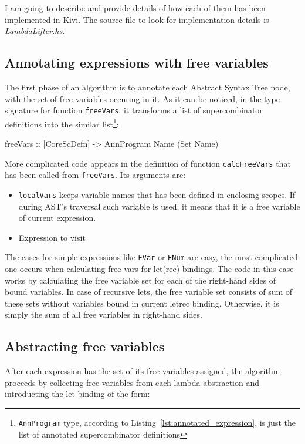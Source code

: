 \documentclass[12pt,a4paper]{report}
\begin{document}
I am going to describe and provide details of how each of them has been
implemented in Kivi. The source file to look for implementation details is
\textit{LambdaLifter.hs}.

\subsection{Annotating expressions with free variables}
The first phase of an algorithm is to annotate each Abstract Syntax Tree
node, with the set of free variables occuring in it. As it can be noticed,
in the type signature for function \texttt{freeVars}, it transforms a list of
supercombinator definitions into the similar list\footnote{\texttt{AnnProgram}
type, according to Listing~\ref{lst:annotated_expression}, is just the list of
annotated supercombinator definitions}:

\vspace*{0.2in}
\begin{code}[style=haskell]
  freeVars :: [CoreScDefn] -> AnnProgram Name (Set Name)
\end{code}

More complicated code appears in the definition of function
\texttt{calcFreeVars} that has been called from \texttt{freeVars}. Its
arguments are:
\begin{itemize}
  \item \texttt{localVars} keeps variable names that has been defined in
    enclosing scopes. If during AST's traversal such variable is used, it
    means that it is a free variable of current expression.
  \item Expression to visit
\end{itemize}

The cases for simple expressions like \texttt{EVar} or \texttt{ENum} are easy,
the most complicated one occurs when calculating free vars for let(rec)
bindings. The code in this case works by calculating the free variable set for
each of the right-hand sides of bound variables. In case of recursive lets, the
free variable set consists of sum of these sets without variables bound in
current letrec binding. Otherwise, it is simply the sum of all free variables in
right-hand sides.

\subsection{Abstracting free variables}
After each expression has the set of its free variables assigned, the algorithm
proceeds by collecting free variables from each lambda abstraction and
introducting the let binding of the form:
\end{document}
